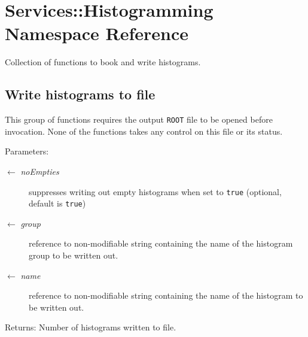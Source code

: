 \hypertarget{namespaceServices_1_1Histogramming}{
\section{Services::Histogramming Namespace Reference}
\label{namespaceServices_1_1Histogramming}
}
Collection of functions to book and write histograms.  


\subsection*{Write histograms to file}
This group of functions requires the output {\tt ROOT} file to be opened before invocation. None of the functions takes any control on this file or its status.

\begin{Desc}
\item[Parameters:]
\begin{description}
\item[\mbox{$\leftarrow$} {\em no\-Empties}]suppresses writing out empty histograms when set to {\tt true} (optional, default is {\tt true}) \item[\mbox{$\leftarrow$} {\em group}]reference to non-modifiable string containing the name of the histogram group to be written out. \item[\mbox{$\leftarrow$} {\em name}]reference to non-modifiable string containing the name of the histogram to be written out.\end{description}
\end{Desc}
\begin{Desc}
\item[Returns:]Number of histograms written to file. \end{Desc}
